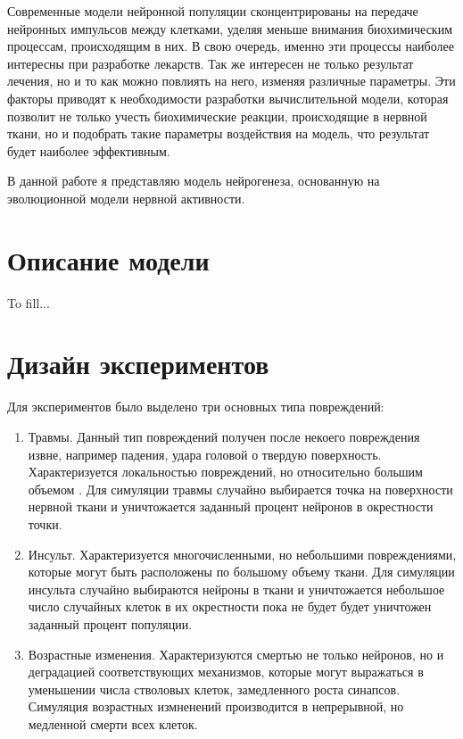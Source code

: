 \documentclass{spbau-diploma}
\begin{document}
Современные модели нейронной популяции сконцентрированы на передаче нейронных импульсов между клетками, уделяя меньше внимания биохимическим процессам, происходящим в них. В свою очередь, именно эти процессы наиболее интересны при разработке лекарств. Так же интересен не только результат лечения, но и то как можно повлиять на него, изменяя различные параметры. Эти факторы приводят к необходимости разработки вычислительной модели, которая позволит не только учесть биохимические реакции, происходящие в нервной ткани, но и подобрать такие параметры воздействия на модель, что результат будет наиболее эффективным.

В данной работе я представляю модель нейрогенеза, основанную на эволюционной модели нервной активности.

\section{Описание модели}

To fill...

\section{Дизайн экспериментов}

Для экспериментов было выделено три основных типа повреждений:

\begin{enumerate}
    \item Травмы. Данный тип повреждений получен после некоего повреждения извне, например падения, удара головой о твердую поверхность. Характеризуется локальностью повреждений, но относительно большим объемом \cite{genesis_trauma}. Для симуляции травмы случайно выбирается точка на поверхности нервной ткани и уничтожается заданный процент нейронов в окрестности точки.
    \item Инсульт. Характеризуется многочисленными, но небольшими повреждениями, которые могут быть расположены по большому объему ткани\cite{genesis_stroke}. Для симуляции инсульта случайно выбираются нейроны в ткани и уничтожается небольшое число случайных клеток в их окрестности пока не будет будет уничтожен заданный процент популяции.
    \item Возрастные изменения. Характеризуются смертью не только нейронов, но и деградацией соответствующих механизмов, которые могут выражаться в уменьшении числа стволовых клеток, замедленного роста синапсов\cite{genesis_aging}. Симуляция возрастных измненений производится в непрерывной, но медленной смерти всех клеток.  
\end{enumerate}
\end{document}
